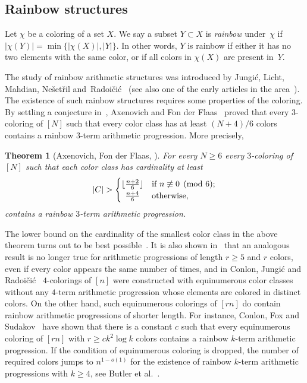 \documentclass[a4paper, 11pt,reqno]{amsart}
\newtheorem{theorem}{Theorem}
\theoremstyle{definition}
\begin{document}
\subsection{Rainbow structures}
Let $\chi$ be a coloring of a set $X$.
We say a subset $Y\subset X$ is \emph{rainbow} under~$\chi$ if $\bigl|\chi(Y)\bigr|=\min \bigl\{|\chi(X)|, |Y|\bigr\}$.
In other words, $Y$ is rainbow if either it has no two elements with the same color, or if all colors in $\chi(X)$ are
present in~$Y$.

The study of rainbow arithmetic structures was introduced by Jungi\'c, Licht, Mahdian, Ne\v set\v ril and~Radoi\v ci\'c~\cite{JLMNR2001}
(see also one of the early articles in the area~\cite{jnr}).
The existence of such rainbow structures requires some properties of the coloring.
By settling  a conjecture in~\cite{JLMNR2001},
Axenovich and Fon der Flaas~\cite{af2004} proved that every $3$-coloring of $[N]$  such that every color class has at least
$(N+4)/6$ colors contains a rainbow $3$-term arithmetic progression.  More precisely,

\begin{theorem}[{Axenovich, Fon der Flaas, \cite{af2004}}]\label{thm-af}
For every $N\ge 6$ every $3$-coloring of~$[N]$ such that each color
class has cardinality at least
\[
|C|>
\begin{cases}
  \lfloor \frac{n+2}{6}\rfloor& \text{if $n\not\equiv 0 \pmod 6$;}\\
  \hfil\frac{n+4}{6} & \text{otherwise,}
\end{cases}
\]
contains a rainbow $3$-term arithmetic progression.
\end{theorem}


The lower bound on the cardinality  of the smallest color class  {in the above theorem turns out to be
best possible~\cite{JLMNR2001}}. {It is also shown in~\cite{af2004} that an analogous  result is no longer true for
arithmetic progressions of length $r\ge 5$ and $r$ colors, even if every color appears the same number
of times, and in Conlon, Jungi\'c and Radoi\v ci\'c~\cite{cjr2007}
$4$-colorings of $[n]$ were constructed with equinumerous
color classes without any $4$-term arithmetic progression whose elements are colored in distinct colors.}
On the other hand, such equinumerous colorings of $[rn]$ do
contain  rainbow arithmetic progressions of shorter length. For instance, Conlon, Fox and Sudakov~\cite{CFS2020}
have shown that there is a constant $c$ such that every equinumerous coloring of $[rn]$
with $r\ge ck^2\log k$ colors contains a rainbow $k$-term
arithmetic progression. If the condition of equinumerous coloring is dropped, the number of required colors
jumps to
$n^{1-o(1)}$ {for the existence of rainbow $k$-term arithmetic progressions with $k\ge 4$, see Butler
et al.~\cite{B2016}.}
\end{document}

